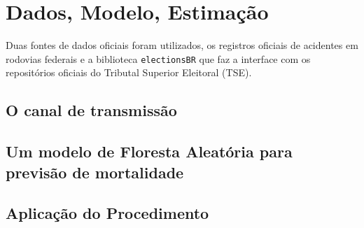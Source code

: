 

\chapter{Dados, Modelo, Estimação}

Duas fontes de dados oficiais foram utilizados, os registros oficiais de acidentes em rodovias federais \cite{PRF} e a biblioteca \texttt{electionsBR} \cite{elections} que faz a interface com os repositórios oficiais do Tributal Superior Eleitoral (TSE).

\section{O canal de transmissão}

\section{Um modelo de Floresta Aleatória para previsão de mortalidade}

\section{Aplicação do Procedimento}
